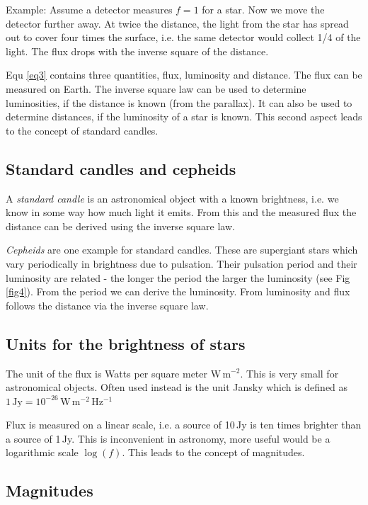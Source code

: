 Example: Assume a detector measures $f=1$ for a star. Now we move the detector further away. At twice the distance, the light from the star has spread out to cover four times the surface, i.e. the same detector would collect 1/4 of the light. The flux drops with the inverse square of the distance.

Equ \eqref{eq3} contains three quantities, flux, luminosity and distance. The flux can be measured on Earth. The inverse square law can be used to determine luminosities, if the distance is known (from the parallax). It can also be used to determine distances, if the luminosity of a star is known. This second aspect leads to the concept of standard candles.

\subsection{Standard candles and cepheids}

A \textit{standard candle} is an astronomical object with a known brightness, i.e. we know in some way how much light it emits. From this and the measured flux the distance can be derived using the inverse square law.

\textit{Cepheids} are one example for standard candles. These are supergiant stars which vary periodically in brightness due to pulsation. Their pulsation period and their luminosity are related - the longer the period the larger the luminosity (see Fig \ref{fig4}). From the period we can derive the luminosity. From luminosity and flux follows the distance via the inverse square law.

\subsection{Units for the brightness of stars}

The unit of the flux is Watts per square meter W\,m$^{-2}$. This is very small for astronomical objects. Often used instead is the unit Jansky which is defined as $1\,\mathrm{Jy} = 10^{-26}$\,W\,m$^{-2}$\,Hz$^{-1}$

Flux is measured on a linear scale, i.e. a source of 10\,Jy is ten times brighter than a source of 1\,Jy. This is inconvenient in astronomy, more useful would be a logarithmic scale $\log{(f)}$. This leads to the concept of magnitudes.

\subsection{Magnitudes}

